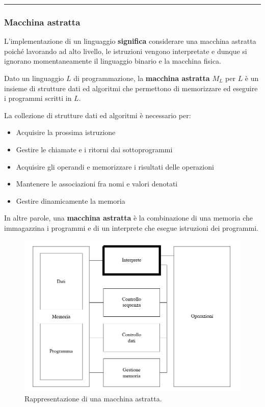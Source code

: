\documentclass[a4paper]{article}
\newcommand{\longline}{\noindent\rule{\textwidth}{0.4pt}}
\begin{document}
	\longline\newpage

	\subsubsection{Macchina astratta}

	\noindent
	L'implementazione di un linguaggio \textbf{significa} considerare una macchina astratta poiché lavorando ad alto livello, le istruzioni vengono interpretate e dunque si ignorano momentaneamente il linguaggio binario e la macchina fisica.
	\begin{boxdef}
		Dato un linguaggio $L$ di programmazione, la \textcolor{Red3}{\textbf{macchina astratta}} $M_{L}$ per $L$ è un insieme di strutture dati ed algoritmi che permettono di memorizzare ed eseguire i programmi scritti in $L$.
	\end{boxdef}
	
	\noindent
	La collezione di strutture dati ed algoritmi è necessario per:
	\begin{itemize}
		\item Acquisire la prossima istruzione
		
		\item Gestire le chiamate e i ritorni dai sottoprogrammi
		
		\item Acquisire gli operandi e memorizzare i risultati delle operazioni
		
		\item Mantenere le associazioni fra nomi e valori denotati
		
		\item Gestire dinamicamente la memoria
	\end{itemize}

	\noindent
	In altre parole, una \textbf{macchina astratta} è la combinazione di una memoria che immagazzina i programmi e di un interprete che esegue istruzioni dei programmi.
	\begin{figure}[!htp]
		\centering
		\includegraphics[width=\textwidth]{img/macchina_astratta.png}
		\caption{Rappresentazione di una macchina astratta.}
	\end{figure}
	
\end{document}
